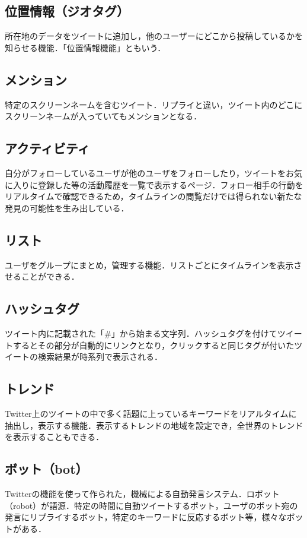 \subsection{位置情報（ジオタグ）}
所在地のデータをツイートに追加し，他のユーザーにどこから投稿しているかを知らせる機能．「位置情報機能」ともいう．

\subsection{メンション}
特定のスクリーンネームを含むツイート．リプライと違い，ツイート内のどこにスクリーンネームが入っていてもメンションとなる．

\subsection{アクティビティ}
自分がフォローしているユーザが他のユーザをフォローしたり，ツイートをお気に入りに登録した等の活動履歴を一覧で表示するページ．フォロー相手の行動をリアルタイムで確認できるため，タイムラインの閲覧だけでは得られない新たな発見の可能性を生み出している．

\subsection{リスト}
ユーザをグループにまとめ，管理する機能．リストごとにタイムラインを表示させることができる．

\subsection{ハッシュタグ}
ツイート内に記載された「\#」から始まる文字列．ハッシュタグを付けてツイートするとその部分が自動的にリンクとなり，クリックすると同じタグが付いたツイートの検索結果が時系列で表示される．

\subsection{トレンド}
Twitter上のツイートの中で多く話題に上っているキーワードをリアルタイムに抽出し，表示する機能．表示するトレンドの地域を設定でき，全世界のトレンドを表示することもできる．

\subsection{ボット（bot）}
Twitterの機能を使って作られた，機械による自動発言システム．ロボット（robot）が語源．特定の時間に自動ツイートするボット，ユーザのボット宛の発言にリプライするボット，特定のキーワードに反応するボット等，様々なボットがある．

